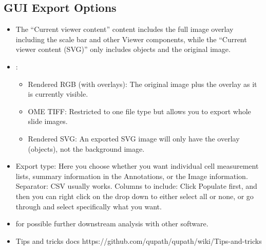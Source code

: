 \documentclass[a4paper,DIV=17,dvipsnames,headsepline]{scrartcl}
\begin{document}
\subsection{GUI Export Options}
\begin{itemize}
    \item {} The “Current viewer content” content includes the full image overlay including the scale bar and other Viewer components, while the ``Current viewer content (SVG)'' only includes objects and the original image.
    \item {}: 
    \begin{itemize}
        \item Rendered RGB (with overlays): The original image plus the overlay as it is currently visible. %
        \item OME TIFF: Restricted to one file type but allows you to export whole slide images. %
        \item Rendered SVG: %
        An exported SVG image will only have the overlay (objects), not the background image.
    \end{itemize}
    \item {}  %
    Export type: Here you choose whether you want individual cell measurement lists, summary information in the Annotations, or the Image information. Separator: CSV usually works. Columns to include: Click Populate first, and then you can right click on the drop down to either select all or none, or go through and select specifically what you want.
    \item  {}  for possible further downstream analysis with other software.
    \item  Tips and tricks docs https://github.com/qupath/qupath/wiki/Tips-and-tricks
\end{itemize}
\end{document}
